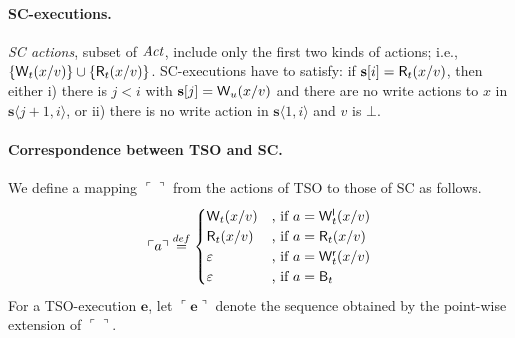 \paragraph{SC-executions.}
{\em SC actions}, subset of $\mathit{Act}$, include only the first two kinds of actions; i.e., $\{\mathsf{W}_{t}(x/v)\}\cup\{\mathsf{R}_{t}(x/v)\}$.
SC-executions have to satisfy: if $\mathbf{s}[i]=\mathsf{R}_{t}(x/v)$, then either i) there is $j<i$ with $\mathbf{s}[j]=\mathsf{W}_{u}(x/v)$ and there are no write actions to $x$ in $\mathbf{s}\langle j+1,i\rangle$, or ii) there is no write action in $\mathbf{s}\langle 1,i\rangle$ and $v$ is $\bot$.



\newcommand{\SCofTSO}{\ensuremath{\mathsf{SC}}}
\newcommand{\SCofTSOx}[1]{\ensuremath{\SCofTSO(#1)}}
\newcommand{\SCofTSOstrict}{\ensuremath{\SCofTSO_S}}
\newcommand{\SCofTSOstrictx}[1]{\ensuremath{\SCofTSOstrict(#1)}}
\newcommand{\aliconvert}{\ensuremath{\ulcorner \urcorner}}
\newcommand{\aliconvertx}[1]{\ensuremath{\ulcorner #1 \urcorner}}
\newcommand{\tsoequiv}{\ensuremath{\approx}}
\newcommand{\tsoequivstrict}{\ensuremath{\tsoequiv_S}}
\newcommand{\equivclassx}[2]{\ensuremath{[#1]_{#2}}}
\newcommand{\tighter}{\ensuremath{\sqsubseteq}}
\newcommand{\tighterstrict}{\ensuremath{\tighter_S}}
\newcommand{\tightclosure}{\ensuremath{\mathsf{T}}}
\newcommand{\tightclosurex}[1]{\ensuremath{\tightclosure(#1)}}
\newcommand{\tightclosurestrict}{\ensuremath{\tightclosure_S}}
\newcommand{\tightclosurestrictx}[1]{\ensuremath{\tightclosurestrict(#1)}}

\paragraph{Correspondence between TSO and SC.}
We define a mapping $\aliconvert$ from the actions of TSO to those of SC as follows.
{\small
\[
\aliconvertx a \stackrel{def}{=} 
 \begin{cases}
  \aliwritex t x v & \text{, if } a=\locwritex t x v\\
  \alireadx t x v & \text{, if } a=\alireadx t x v\\
  \varepsilon & \text{, if } a=\remwritex t x v\\
  \varepsilon & \text{, if } a=\alibarrierx t
 \end{cases}
\]
}
For a TSO-execution $\mathbf{e}$, let $\aliconvertx {\mathbf{e}}$ denote the sequence obtained by the point-wise extension of $\aliconvert$.

